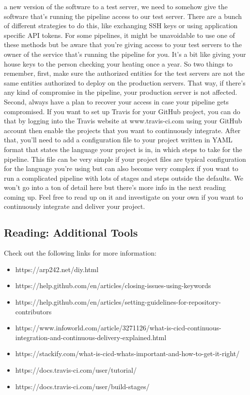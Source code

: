 a new version of the software to a test server, we need to somehow give the software that's running the pipeline access to our test server. There are a bunch of different strategies to do this, like exchanging SSH keys or using application specific API tokens. For some pipelines, it might be unavoidable to use one of these methods but be aware that you're giving access to your test servers to the owner of the service that's running the pipeline for you. It's a bit like giving your house keys to the person checking your heating once a year. So two things to remember, first, make sure the authorized entities for the test servers are not the same entities authorized to deploy on the production servers. That way, if there's any kind of compromise in the pipeline, your production server is not affected. Second, always have a plan to recover your access in case your pipeline gets compromised. If you want to set up Travis for your GitHub project, you can do that by logging into the Travis website at www.travis-ci.com using your GitHub account then enable the projects that you want to continuously integrate. After that, you'll need to add a configuration file to your project written in YAML format that states the language your project is in, in which steps to take for the pipeline. This file can be very simple if your project files are typical configuration for the language you're using but can also become very complex if you want to run a complicated pipeline with lots of stages and steps outside the defaults. We won't go into a ton of detail here but there's more info in the next reading coming up. Feel free to read up on it and investigate on your own if you want to continuously integrate and deliver your project.
	
	\subsection{Reading: Additional Tools}
	
	Check out the following links for more information:
	
	\begin{itemize}
		
\item https://arp242.net/diy.html 
	
\item https://help.github.com/en/articles/closing-issues-using-keywords
	
\item https://help.github.com/en/articles/setting-guidelines-for-repository-contributors 
	
\item https://www.infoworld.com/article/3271126/what-is-cicd-continuous-integration-and-continuous-delivery-explained.html
	
\item https://stackify.com/what-is-cicd-whats-important-and-how-to-get-it-right/
	
\item https://docs.travis-ci.com/user/tutorial/
	
\item https://docs.travis-ci.com/user/build-stages/
	
	\end{itemize}

